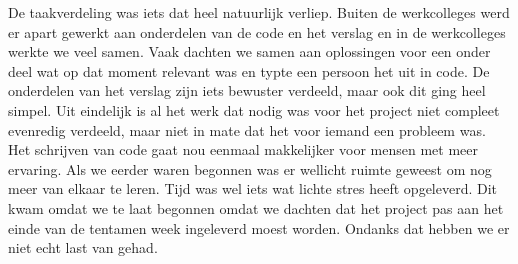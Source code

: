 \documentclass{article}
\begin{document}
De taakverdeling was iets dat heel natuurlijk verliep. Buiten de werkcolleges werd er apart gewerkt aan onderdelen van de code en het verslag en in de werkcolleges werkte we veel samen. Vaak dachten we samen aan oplossingen voor een onder deel wat op dat moment relevant was en typte een persoon het uit in code. De onderdelen van het verslag zijn iets bewuster verdeeld, maar ook dit ging heel simpel. Uit eindelijk is al het werk dat nodig was voor het project niet compleet evenredig verdeeld, maar niet in mate dat het voor iemand een probleem was. Het schrijven van code gaat nou eenmaal makkelijker voor mensen met meer ervaring. Als we eerder waren begonnen was er wellicht ruimte geweest om nog meer van elkaar te leren. \newline
Tijd was wel iets wat lichte stres heeft opgeleverd. Dit kwam omdat we te laat begonnen omdat we dachten dat het project pas aan het einde van de tentamen week ingeleverd moest worden. Ondanks dat hebben we er niet echt last van gehad.
\end{document}
